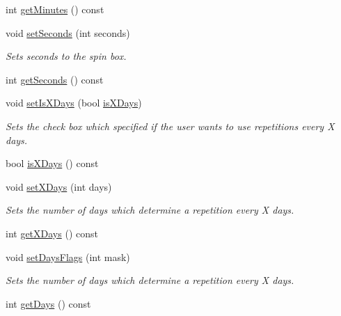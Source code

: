 \begin{DoxyCompactItemize}
int \hyperlink{class_action_settings_a1c9bc98f4228818443e02c7e7224b05d}{get\-Minutes} () const 
\item 
void \hyperlink{class_action_settings_a559f59ec9a8675c3c53272cb791735bd}{set\-Seconds} (int seconds)
\begin{DoxyCompactList}\small\item\em Sets seconds to the spin box. \end{DoxyCompactList}\item 
int \hyperlink{class_action_settings_aa15091473a8be5849d29af3ab9497716}{get\-Seconds} () const 
\item 
void \hyperlink{class_action_settings_a8e00a0b7449cc2c2e144c035efd6150d}{set\-Is\-X\-Days} (bool \hyperlink{class_action_settings_a8f551339364e7535468bc2418b0d1715}{is\-X\-Days})
\begin{DoxyCompactList}\small\item\em Sets the check box which specified if the user wants to use repetitions every X days. \end{DoxyCompactList}\item 
bool \hyperlink{class_action_settings_a8f551339364e7535468bc2418b0d1715}{is\-X\-Days} () const 
\item 
void \hyperlink{class_action_settings_a4107237b01a3832e8eadf1cfd172b1db}{set\-X\-Days} (int days)
\begin{DoxyCompactList}\small\item\em Sets the number of days which determine a repetition every X days. \end{DoxyCompactList}\item 
int \hyperlink{class_action_settings_a4da2cfe5b881ccf4b217a8f857e898e7}{get\-X\-Days} () const 
\item 
void \hyperlink{class_action_settings_a46eaaa89d414c1d13da166d7953760ae}{set\-Days\-Flags} (int mask)
\begin{DoxyCompactList}\small\item\em Sets the number of days which determine a repetition every X days. \end{DoxyCompactList}\item 
int \hyperlink{class_action_settings_a16bf753ffb5c9376af53441977bb2d4a}{get\-Days} () const 
\end{DoxyCompactItemize}
